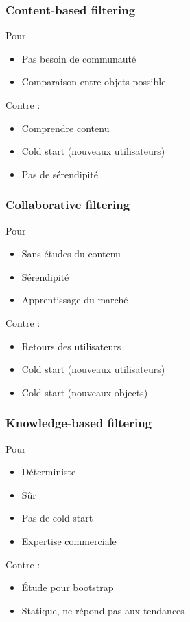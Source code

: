 \documentclass[t]{beamer}
\newcommand\blue[1]{\textcolor{blue}{#1}}
\begin{document}
\begin{frame}
  \frametitle{Content-based filtering}

  Pour
  \begin{itemize}
  \item Pas besoin de communauté
  \item Comparaison entre objets possible.
  \end{itemize}

  \bigskip
  Contre :
  \begin{itemize}
  \item Comprendre contenu
  \item Cold start (nouveaux utilisateurs)
  \item Pas de sérendipité
  \end{itemize}
\end{frame}

\begin{frame}
  \frametitle{Collaborative filtering}

  Pour
  \begin{itemize}
  \item Sans études du contenu
  \item Sérendipité
  \item Apprentissage du marché
  \end{itemize}

  \bigskip
  Contre :
  \begin{itemize}
  \item Retours des utilisateurs
  \item Cold start (nouveaux utilisateurs)
  \item Cold start (nouveaux objects)
  \end{itemize}
\end{frame}

\begin{frame}
  \frametitle{Knowledge-based filtering}

  Pour
  \begin{itemize}
  \item Déterministe
  \item Sûr
  \item Pas de cold start
  \item Expertise commerciale
  \end{itemize}

  \bigskip
  Contre :
  \begin{itemize}
  \item Étude pour bootstrap
  \item Statique, ne répond pas aux tendances
  \end{itemize}

  \only<2>{\bigskip \blue{On n'en parle plus.}}
\end{frame}
\end{document}
